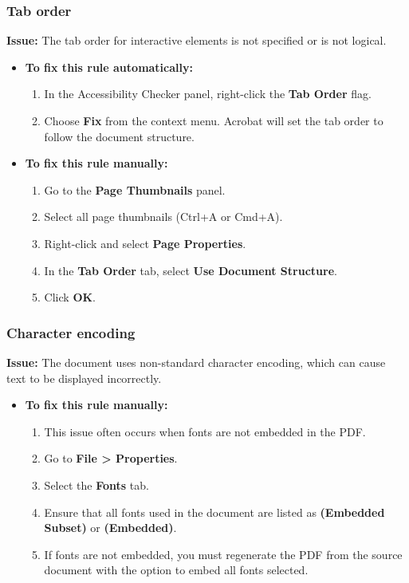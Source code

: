 \subsubsection{Tab order}
\label{ssubsec:pdf-tab-order}

\textbf{Issue:} The tab order for interactive elements is not specified or is not logical.

\begin{itemize}
	\item \textbf{To fix this rule automatically:}
	      \begin{enumerate}
		      \item In the Accessibility Checker panel, right-click the \textbf{Tab Order} flag.
		      \item Choose \textbf{Fix} from the context menu. Acrobat will set the tab order to follow the document structure.
	      \end{enumerate}
	\item \textbf{To fix this rule manually:}
	      \begin{enumerate}
		      \item Go to the \textbf{Page Thumbnails} panel.
		      \item Select all page thumbnails (Ctrl+A or Cmd+A).
		      \item Right-click and select \textbf{Page Properties}.
		      \item In the \textbf{Tab Order} tab, select \textbf{Use Document Structure}.
		      \item Click \textbf{OK}.
	      \end{enumerate}
\end{itemize}

\subsubsection{Character encoding}
\label{ssubsec:pdf-character-encoding}

\textbf{Issue:} The document uses non-standard character encoding, which can cause text to be displayed incorrectly.

\begin{itemize}
	\item \textbf{To fix this rule manually:}
	      \begin{enumerate}
		      \item This issue often occurs when fonts are not embedded in the PDF.
		      \item Go to \textbf{File > Properties}.
		      \item Select the \textbf{Fonts} tab.
		      \item Ensure that all fonts used in the document are listed as \textbf{(Embedded Subset)} or \textbf{(Embedded)}.
		      \item If \gls{fonts} are not embedded, you must regenerate the PDF from the source document with the option to embed all \gls{fonts} selected.
	      \end{enumerate}
\end{itemize}

